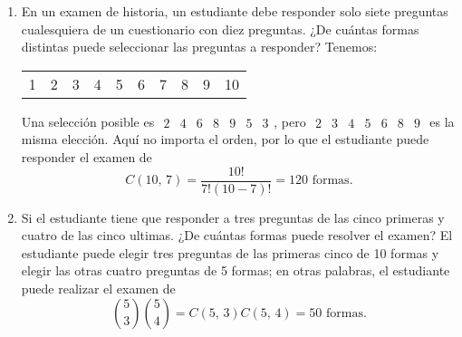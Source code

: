 \begin{myexample}
    \begin{enumerate}[label=\alph*)]
        \item En un examen de historia, un estudiante debe responder solo siete preguntas cualesquiera de un cuestionario con diez preguntas. ¿De cuántas formas distintas puede seleccionar las preguntas a responder? Tenemos:
        \begin{center}
            \begin{tabular}{cccccccccc}
                1 & 2 & 3 & 4 & 5 & 6 & 7 & 8 & 9 & 10
            \end{tabular}
        \end{center}
        Una selección posible es $\begin{array}{ccccccc}
            2 & 4 & 6 & 8 & 9 & 5 & 3
        \end{array}$\!\!, pero $\begin{array}{ccccccc}
            2 & 3 & 4 & 5 & 6 & 8 & 9
        \end{array}$ es la misma elección. Aquí no importa el orden, por lo que el estudiante puede responder el examen de
        $$C(10, \, 7) = \frac{10!}{7!(10-7)!} = 120 \text{ formas.}$$
        \item Si el estudiante tiene que responder a tres preguntas de las cinco primeras y cuatro de las cinco ultimas. ¿De cuántas formas puede resolver el examen? El estudiante puede elegir tres preguntas de las primeras cinco de 10 formas y elegir las otras cuatro preguntas de 5 formas; en otras palabras, el estudiante puede realizar el examen de
        $$\binom{5}{3} \binom{5}{4} = C(5, \, 3) C(5, \, 4) = 50 \text{ formas.}$$
    \end{enumerate}
\end{myexample}

\newpage

